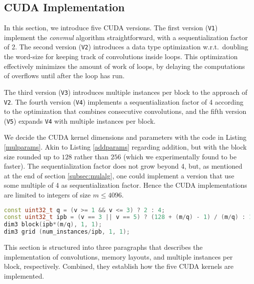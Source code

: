 \subsection{CUDA Implementation}
\label{subsec:mulcud}

In this section, we introduce five CUDA versions. The first version
(\texttt{V1}) implement the \textit{convmul} algorithm straightforward, with a
sequentialization factor of 2. The second version (\texttt{V2}) introduces a
data type optimization w.r.t.\ doubling the word-size for keeping track of
convolutions inside loops. This optimization effectively minimizes the amount of
work of loops, by delaying the computations of overflows until after the loop
has run.

The third version (\texttt{V3}) introduces multiple instances per block to the
approach of \texttt{V2}. The fourth version (\texttt{V4}) implements a
sequentialization factor of 4 according to the optimization that combines
consecutive convolutions, and the fifth version (\texttt{V5}) expands
\texttt{V4} with multiple instances per block.

We decide the CUDA kernel dimensions and parameters with the code in Listing
\ref{mulparams}. Akin to Listing \ref{addparams} regarding addition, but with
the block size rounded up to $128$ rather than $256$ (which we experimentally
found to be faster). The sequentialization factor does not grow beyond 4, but,
as mentioned at the end of section \ref{subsec:mulalg}, one could implement a
version that use some multiple of 4 as sequentialization factor. Hence the CUDA
implementations are limited to integers of size $m\leq4096$.

\begin{lstlisting}[language=CPP,caption={\footnotesize CUDA multiplication parameters and dimensions for version $v$ with size $m$ and $num\_instances$.},label={mulparams}]
const uint32_t q = (v >= 1 && v <= 3) ? 2 : 4;
const uint32_t ipb = (v == 3 || v == 5) ? (128 + (m/q) - 1) / (m/q) : 1;
dim3 block(ipb*(m/q), 1, 1);
dim3 grid (num_instances/ipb, 1, 1);
\end{lstlisting}

This section is structured into three paragraphs that describes the
implementation of convolutions, memory layouts, and multiple instances per
block, respectively. Combined, they establish how the five CUDA kernels are
implemented.

